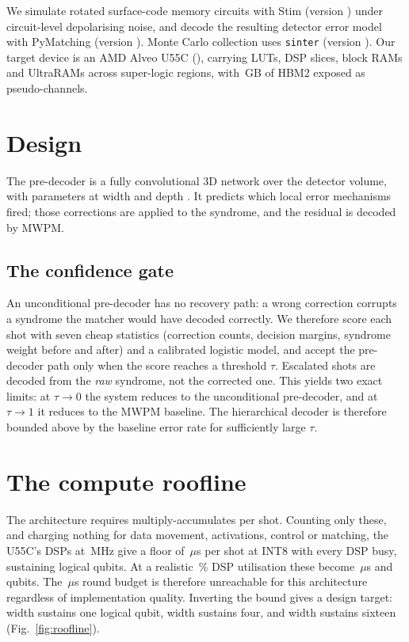 \documentclass[pdflatex,sn-mathphys-num]{sn-jnl}
\begin{document}
We simulate rotated surface-code memory circuits with Stim \cite{gidney2021stim}
(version \envStim) under circuit-level depolarising noise, and decode the
resulting detector error model with PyMatching \cite{higgott2025sparseblossom}
(version \envPyMatching). Monte Carlo collection uses \texttt{sinter}
(version \envSinter). Our target device is an AMD Alveo U55C
(\devPart), carrying \devLUT{} LUTs, \devDSP{} DSP slices, \devBRAM{} block RAMs
and \devURAM{} UltraRAMs across \devSLR{} super-logic regions, with \devHBMGB\,GB
of HBM2 exposed as \devHBMChannels{} pseudo-channels.

\section{Design}\label{sec:design}

The pre-decoder is a fully convolutional 3D network over the detector volume,
with \trainParams{} parameters at width \archWidth{} and depth \archDepth. It
predicts which local error mechanisms fired; those corrections are applied to the
syndrome, and the residual is decoded by MWPM.

\subsection{The confidence gate}\label{sec:gate}

An unconditional pre-decoder has no recovery path: a wrong correction corrupts a
syndrome the matcher would have decoded correctly. We therefore score each shot
with seven cheap statistics (correction counts, decision margins, syndrome weight
before and after) and a calibrated logistic model, and accept the pre-decoder
path only when the score reaches a threshold $\tau$. Escalated shots are decoded
from the \emph{raw} syndrome, not the corrected one. This yields two exact
limits: at $\tau \to 0$ the system reduces to the unconditional pre-decoder, and
at $\tau \to 1$ it reduces to the MWPM baseline. The hierarchical decoder is
therefore bounded above by the baseline error rate for sufficiently large $\tau$.

\section{The compute roofline}\label{sec:roofline}

The architecture requires \archMACs{} multiply-accumulates per shot. Counting
only these, and charging nothing for data movement, activations, control or
matching, the U55C's \devDSP{} DSPs at \rooflineClock\,MHz give a floor of
\rooflineIntEightLatency\,$\mu$s per shot at INT8 with every DSP busy, sustaining
\rooflineIntEightQubits{} logical qubits. At a realistic \dspUtilisation\,\% DSP utilisation
these become \rooflineIntEightLatencyHalf\,$\mu$s and
\rooflineIntEightQubitsHalf{} qubits. The \roundBudget\,$\mu$s round budget is
therefore unreachable for this architecture regardless of implementation quality.
Inverting the bound gives a design target: width \widthForQubitsOne{} sustains one
logical qubit, width \widthForQubitsFour{} sustains four, and width
\widthForQubitsSixteen{} sustains sixteen (Fig.~\ref{fig:roofline}).
\end{document}
